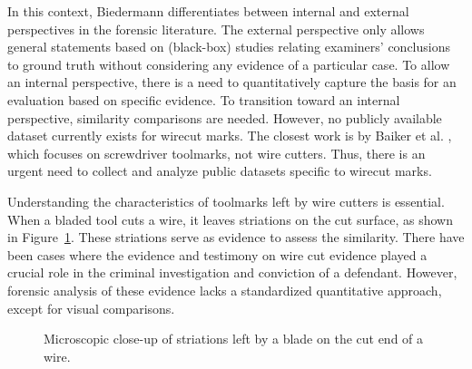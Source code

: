 \documentclass[fleqn,10pt]{wlscirep}
\begin{document}
In this context, Biedermann
\citep{biedermannStrangePersistenceSource2022} differentiates between
internal and external perspectives in the forensic literature. The
external perspective only allows general statements based on (black-box)
studies relating examiners' conclusions to ground truth without
considering any evidence of a particular case. To allow an internal
perspective, there is a need to quantitatively capture the basis for an
evaluation based on specific evidence. To transition toward an internal
perspective, similarity comparisons are needed. However, no publicly
available dataset currently exists for wirecut marks. The closest work
is by Baiker et al. \citep{baikerToolmarkVariabilityQuality2015a}, which
focuses on screwdriver toolmarks, not wire cutters. Thus, there is an
urgent need to collect and analyze public datasets specific to wirecut
marks.

Understanding the characteristics of toolmarks left by wire cutters is
essential. When a bladed tool cuts a wire, it leaves striations on the
cut surface, as shown in Figure~\ref{fig-cut-microscope}. These
striations serve as evidence to assess the similarity. There have been
cases where the evidence and testimony on wire cut evidence played a
crucial role in the criminal investigation and conviction of a
defendant. However, forensic analysis of these evidence lacks a
standardized quantitative approach, except for visual comparisons.

\begin{figure}


\caption{\label{fig-cut-microscope}Microscopic close-up of striations
left by a blade on the cut end of a wire.}

\end{figure}%
\end{document}
